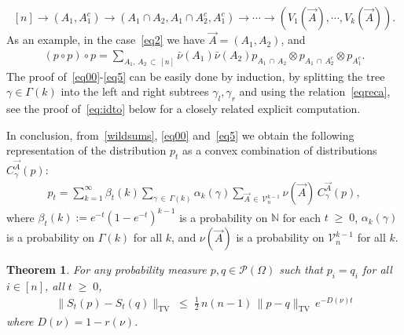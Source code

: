 \documentclass[10pt,a4paper]{article}
\newtheorem{theorem}{Theorem}[section]
\renewcommand{\leq}{\;\leqslant\;}
\renewcommand{\geq}{\;\geqslant\;}
\newcommand{\tv}{\mathrm{TV}}
\newcommand{\cP}{\mathcal{P}}
\newcommand{\cV}{\mathcal{V}}
\newcommand{\bbN}{\mathbb{N}}
\let\b=\beta
\let\g=\gamma
\let\G=\Gamma
\let\O=\Omega
\begin{document}
\[
[n]\to (A_1,A_1^c) \to (A_1\cap A_2,A_1\cap A_2^c,A_1^c)\to\cdots\to \left(V_1(\vec A),\cdots,V_k(\vec A)\right).
\]
As an example, in the case~\eqref{eq2} we have $\vec A=(A_1,A_2)$, and
\begin{align}
(p \circ p)\circ p = \sum_{A_1,\,A_2 \,\subset\,[n]}\bar\nu(A_1)\bar\nu(A_2)p_{A_1\,\cap\,A_2}\otimes p_{A_1\,\cap\,A_2^c} \otimes p_{A_1^c}.
\end{align}
The proof of~\eqref{eq00}-\eqref{eq5} can be easily done by induction, by splitting the tree $\g\in\G(k)$ into the left and right subtrees $\g_l,\g_r$ and using the relation~\eqref{eqreca}, see the proof of~\eqref{eq:idto} below for a closely related explicit computation.

In conclusion, from~\eqref{wildsums}, \eqref{eq00} and~\eqref{eq5} we obtain the following representation of the distribution $p_t$ as a convex combination of distributions $C^{\vec A}_{\gamma}(p)$:
\begin{align}\label{eq0}
p_t=\sum_{k=1}^{\infty}\b_t(k)\sum_{\g\,\in \,\Gamma(k)}\alpha_k(\g)\sum_{\vec A\,\in\, \cV_n^{k-1}}\nu(\vec A) \,C^{\vec A}_{\gamma}(p),
\end{align}
where $\b_t(k) := e^{-t}(1-e^{-t})^{k-1}$ is a probability on $\bbN$ for each $t\geq 0$, $ \alpha_k(\g)$ is a probability on $\G(k)$ for all $k$, and $\nu(\vec A)$ is a probability on $\cV_n^{k-1}$ for all $k$.

\begin{theorem}\label{contrlemma2}
For any probability measure $p,q \in \cP(\O)$ such that $p_{i} = q_{i}$ for all $i \in [n]$, all $t\geq 0$,
\begin{align}\label{nonlincont1}
\|S_t(p)-S_t(q)\|_\tv \leq \tfrac12\,n(n-1)\,\|p-q\|_\tv \,e^{-D(\nu) t}
\end{align}
where $D(\nu)=1-r(\nu)$.
\end{theorem}
\end{document}
